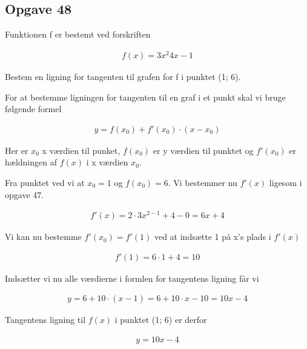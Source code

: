 \subsection{Opgave 48}

Funktionen f er bestemt ved forskriften 

\begin{align*}
    f(x) = 3x^2 4x - 1
\end{align*}

Bestem en ligning for tangenten til grafen for f i punktet (1; 6).

\ans

For at bestemme ligningen for tangenten til en graf i et punkt skal vi bruge følgende formel

\begin{align*}
    y = f(x_0) + f'(x_0)\cdot (x - x_0)
\end{align*}

Her er $x_0$ x værdien til punket, $f(x_0)$ er y værdien til punktet og $f'(x_0)$ er hældningen af $f(x)$ i x værdien $x_0$.

Fra punktet ved vi at $x_0 = 1$ og $f(x_0) = 6$. Vi bestemmer nu $f'(x)$ ligesom i opgave 47.

\begin{align*}
    f'(x) = 2 \cdot 3x^{2-1} + 4 - 0 = 6x + 4
\end{align*}

Vi kan nu bestemme $f'(x_0) = f'(1)$ ved at indsætte 1 på x's plads i $f'(x)$

\begin{align*}
    f'(1) = 6\cdot 1 + 4 = 10
\end{align*}

Indsætter vi nu alle værdierne i formlen for tangentens ligning får vi

\begin{align*}
    y = 6 + 10\cdot (x - 1) = 6 + 10\cdot x - 10 = 10x - 4
\end{align*}

Tangentens ligning til $f(x)$ i punktet (1; 6) er derfor

\begin{align*}
    y = 10x - 4
\end{align*}